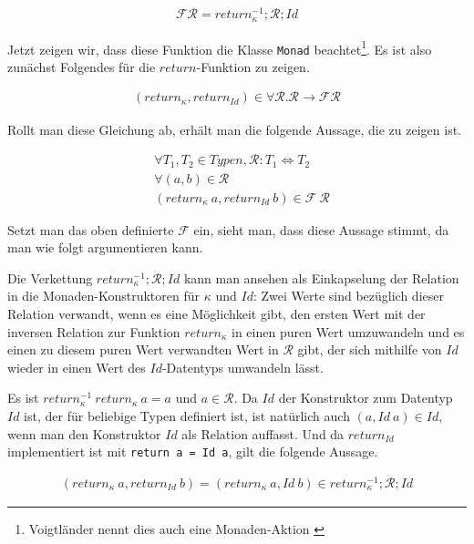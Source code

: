 \begin{align*}
\mathcal{F} \mathcal{R} = return_{\kappa}^{-1} ; \mathcal{R} ; Id
\end{align*}

Jetzt zeigen wir, dass diese Funktion die Klasse \texttt{Monad} beachtet\footnote{Voigtländer nennt dies auch eine Monaden-Aktion \cite{voigtlander}}. Es ist also zunächst Folgendes für die $return$-Funktion zu zeigen.

\begin{align*}
(return_{\kappa}, return_{Id}) \in \forall \mathcal{R}. \mathcal{R} \rightarrow \mathcal{F} \mathcal{R}
\end{align*}

Rollt man diese Gleichung ab, erhält man die folgende Aussage, die zu zeigen ist.

\begin{align*}
& \forall T_1, T_2 \in Typen, \mathcal{R} : T_1 \Leftrightarrow T_2 \\
& \forall (a, b) \in \mathcal{R} \\
& (return_{\kappa}\ a, return_{Id}\ b) \in \mathcal{F}\ \mathcal{R}
\end{align*}

Setzt man das oben definierte $\mathcal{F}$ ein, sieht man, dass diese Aussage stimmt, da man wie folgt argumentieren kann.

Die Verkettung $return_{\kappa}^{-1} ; \mathcal{R} ; Id$ kann man ansehen als Einkapselung der Relation in die 
Monaden-Konstruktoren für $\kappa$ und $Id$: Zwei Werte sind bezüglich dieser Relation verwandt, wenn es
eine Möglichkeit gibt, den ersten Wert mit der inversen Relation zur Funktion $return_{\kappa}$ in einen puren Wert
umzuwandeln und es einen zu diesem puren Wert verwandten Wert in $\mathcal{R}$ gibt, der sich mithilfe von $Id$ wieder
in einen Wert des $Id$-Datentyps umwandeln lässt.

Es ist $return_{\kappa}^{-1}\ return_{\kappa}\ a = a$ und $a \in \mathcal{R}$. Da $Id$ der Konstruktor zum Datentyp $Id$
ist, der für beliebige Typen definiert ist, ist natürlich auch $(a, Id\ a) \in Id$, wenn man den Konstruktor $Id$ als Relation auffasst.
Und da $return_{Id}$ implementiert ist mit \texttt{return a = Id a}, gilt die folgende Aussage.

\begin{align*}
(return_{\kappa}\ a, return_{Id}\ b) = (return_{\kappa}\ a, Id\ b) \in return_{\kappa}^{-1} ; \mathcal{R} ; Id
\end{align*}

